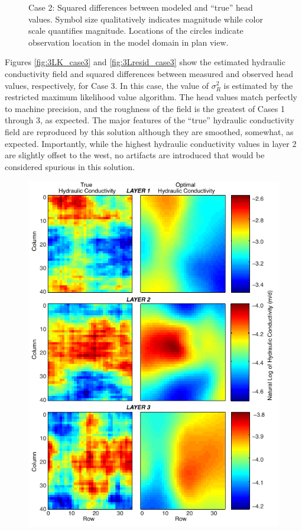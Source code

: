 \documentclass[11pt,oneside,onecolumn]{usgsreport}
\begin{document}
\begin{appendix}
\begin{figure}[!t]
\caption{\label{fig:3Lresid_case2}Case 2: Squared differences between modeled
and ``true'' head values. Symbol size qualitatively indicates magnitude
while color scale quantifies magnitude. Locations of the circles indicate
observation location in the model domain in plan view.}
\end{figure}


Figures \ref{fig:3LK_case3} and \ref{fig:3Lresid_case3} show the
estimated hydraulic conductivity field and squared differences between
measured and observed head values, respectively, for Case 3. In this
case, the value of $\sigma_{R}^{2}$ is estimated by the restricted
maximum likelihood value algorithm. The head values match perfectly
to machine precision, and the roughness of the field is the greatest
of Cases 1 through 3, as expected. The major features of the ``true''
hydraulic conductivity field are reproduced by this solution although
they are smoothed, somewhat, as expected. Importantly, while the highest
hydraulic conductivity values in layer 2 are slightly offset to the
west, no artifacts are introduced that would be considered spurious
in this solution.

\begin{figure}[!t]
\begin{center}\includegraphics{figures/3KL_case3}\end{center}


\end{figure}
\end{appendix}
\end{document}
